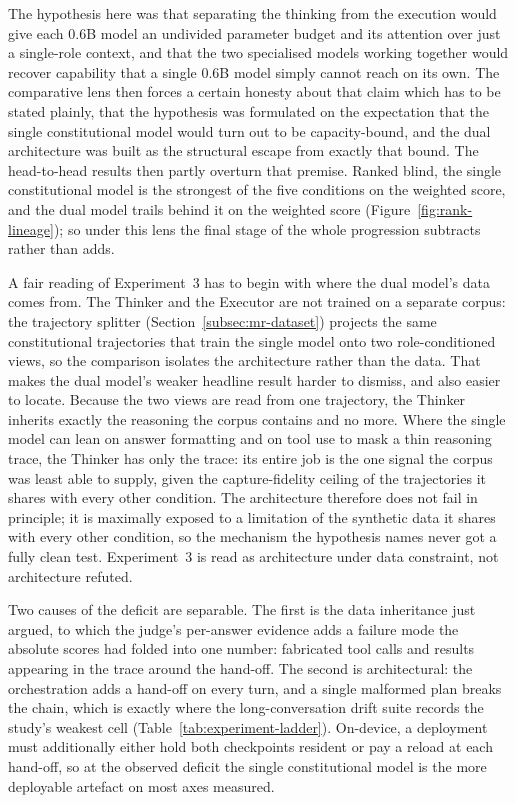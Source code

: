 The hypothesis here was that separating the thinking from the execution would give each 0.6B model an undivided parameter budget and its attention over just a single-role context, and that the two specialised models working together would recover capability that a single 0.6B model simply cannot reach on its own. The comparative lens then forces a certain honesty about that claim which has to be stated plainly, that the hypothesis was formulated on the expectation that the single constitutional model would turn out to be capacity-bound, and the dual architecture was built as the structural escape from exactly that bound. The head-to-head results then partly overturn that premise. Ranked blind, the single constitutional model is the strongest of the five conditions on the weighted score, and the dual model trails behind it on the weighted score (Figure~\ref{fig:rank-lineage}); so under this lens the final stage of the whole progression subtracts rather than adds.

A fair reading of Experiment~3 has to begin with where the dual model's data comes from. The Thinker and the Executor are not trained on a separate corpus: the trajectory splitter (Section~\ref{subsec:mr-dataset}) projects the same constitutional trajectories that train the single model onto two role-conditioned views, so the comparison isolates the architecture rather than the data. That makes the dual model's weaker headline result harder to dismiss, and also easier to locate. Because the two views are read from one trajectory, the Thinker inherits exactly the reasoning the corpus contains and no more. Where the single model can lean on answer formatting and on tool use to mask a thin reasoning trace, the Thinker has only the trace: its entire job is the one signal the corpus was least able to supply, given the capture-fidelity ceiling of the trajectories it shares with every other condition. The architecture therefore does not fail in principle; it is maximally exposed to a limitation of the synthetic data it shares with every other condition, so the mechanism the hypothesis names never got a fully clean test. Experiment~3 is read as architecture under data constraint, not architecture refuted.

Two causes of the deficit are separable. The first is the data inheritance just argued, to which the judge's per-answer evidence adds a failure mode the absolute scores had folded into one number: fabricated tool calls and results appearing in the trace around the hand-off. The second is architectural: the orchestration adds a hand-off on every turn, and a single malformed plan breaks the chain, which is exactly where the long-conversation drift suite records the study's weakest cell (Table~\ref{tab:experiment-ladder}). On-device, a deployment must additionally either hold both checkpoints resident or pay a reload at each hand-off, so at the observed deficit the single constitutional model is the more deployable artefact on most axes measured.

